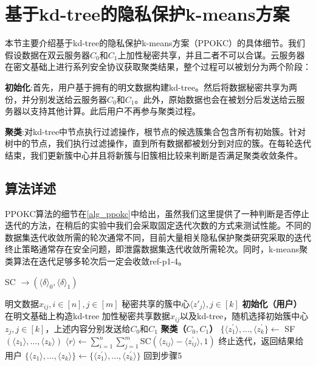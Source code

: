 \section{基于kd-tree的隐私保护k-means方案}
\label{s3-ppokc}
本节主要介绍基于kd-tree的隐私保护k-means方案（PPOKC）的具体细节。我们假设数据在双云服务器$C_0$和$C_1$上加性秘密共享，并且二者不可以合谋。云服务器在密文基础上进行系列安全协议获取聚类结果，整个过程可以被划分为两个阶段：
\begin{compactitem}
    \item \textbf{初始化}:首先，用户基于拥有的明文数据构建kd-tree。然后将数据秘密共享为两份，并分别发送给云服务器$C_0$和$C_1$。此外，原始数据也会在被划分后发送给云服务器以支持其他计算。此后用户不再参与聚类过程。
    \item \textbf{聚类}:对kd-tree中节点执行过滤操作，根节点的候选簇集合包含所有初始簇。针对树中的节点，我们执行过滤操作，直到所有数据都被划分到对应的簇。在每轮迭代结束，我们更新簇中心并且将新簇与旧簇相比较来判断是否满足聚类收敛条件。
\end{compactitem}

\subsection{算法详述}
PPOKC算法的细节在\ref{alg_ppokc}中给出，虽然我们这里提供了一种判断是否停止迭代的方法，在稍后的实验中我们会采取固定迭代次数的方式来测试性能。不同的数据集迭代收敛所需的轮次通常不同，目前大量相关隐私保护聚类研究采取的迭代终止策略通常存在安全问题，即泄露数据集迭代收敛所需轮次。同时，k-means聚类算法在迭代足够多轮次后一定会收敛ref-p1-4。
\begin{algorithm}[htbp]
    \renewcommand{\algorithmicrequire}{\textbf{输入:}}
    \renewcommand{\algorithmicensure}{\textbf{输出:}}
    \caption{SC $\rightarrow (\langle \delta \rangle_0, \langle \delta \rangle_1)$}
    \label{alg_ppokc}
    \begin{algorithmic}[1]
        \REQUIRE 明文数据$x_{ij},i\in[n],j\in[m]$
        \ENSURE 秘密共享的簇中心$\langle z'_j \rangle,j\in[k]$
        \STATE \textbf{初始化（用户）}
        \STATE 在明文基础上构造kd-tree
        \STATE 加性秘密共享数据$x_{ij}$以及kd-tree，随机选择初始簇中心$z_j,j\in[k]$，上述内容分别发送给$C_0$和$C_1$
        \STATE \textbf{聚类（$C_0,C_1$）}
        \STATE $\{\langle z^{\prime}_1 \rangle,...,\langle z^{\prime}_k\} \leftarrow$ SF$(\langle z_1\rangle,...,\langle z_k\rangle)$
        \STATE $\langle r \rangle \leftarrow \sum_{i=1}^{n}\sum_{j=1}^{m}$SC$(\langle z_{ij}\rangle-\langle z_{ij}^{\prime}\rangle, 1)$
        \STATE 终止迭代，返回结果给用户
        \ELSE
        \STATE $\{\langle z_1 \rangle,...,\langle z_k \rangle \} \leftarrow \{\langle z^{\prime}_1 \rangle,...,\langle z^{\prime}_k\rangle\}$
        \STATE 回到步骤5
        \ENDIF
    \end{algorithmic}
\end{algorithm}


